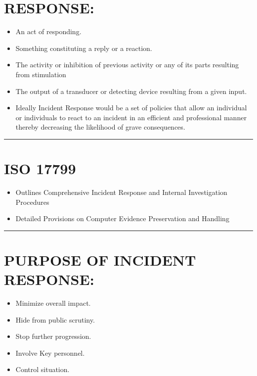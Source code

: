 \documentclass[10pt,british,english]{article}
\begin{document}
\section{RESPONSE: }
\begin{itemize}
\item An act of responding.
\item Something constituting a reply or a reaction.
\item The activity or inhibition of previous activity or any of its parts
resulting from stimulation
\item The output of a transducer or detecting device resulting from a given
input.
\item Ideally Incident Response would be a set of policies that allow an
individual or individuals to react to an incident in an efficient
and professional manner thereby decreasing the likelihood of grave
consequences.
\end{itemize}
\rule[0.5ex]{1\columnwidth}{1pt}

\section{ISO 17799 }
\begin{itemize}
\item Outlines Comprehensive Incident Response and Internal Investigation
Procedures
\item Detailed Provisions on Computer Evidence Preservation and Handling 
\end{itemize}
\rule[0.5ex]{1\columnwidth}{1pt}

\section{PURPOSE OF INCIDENT RESPONSE:}
\begin{itemize}
\item Minimize overall impact.
\item Hide from public scrutiny.
\item Stop further progression.
\item Involve Key personnel.
\item Control situation.
\end{itemize}
%
\end{document}
